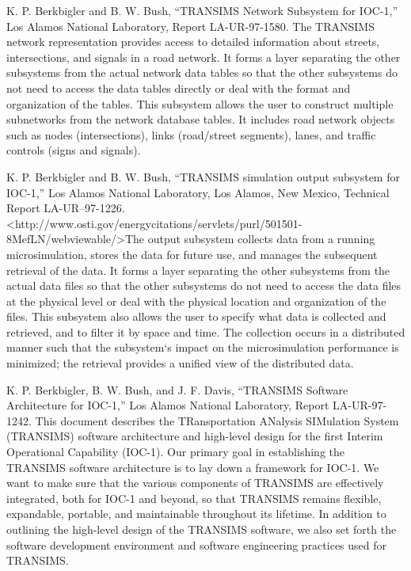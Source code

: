 \documentclass[]{article}
\begin{document}
K. P. Berkbigler and B. W. Bush, ``TRANSIMS Network Subsystem for
IOC-1,'' Los Alamos National Laboratory, Report LA-UR-97-1580. The
TRANSIMS network representation provides access to detailed information
about streets, intersections, and signals in a road network. It forms a
layer separating the other subsystems from the actual network data
tables so that the other subsystems do not need to access the data
tables directly or deal with the format and organization of the tables.
This subsystem allows the user to construct multiple subnetworks from
the network database tables. It includes road network objects such as
nodes (intersections), links (road/street segments), lanes, and traffic
controls (signs and signals).

K. P. Berkbigler and B. W. Bush, ``TRANSIMS simulation output subsystem
for IOC-1,'' Los Alamos National Laboratory, Los Alamos, New Mexico,
Technical Report LA-UR--97-1226.
\textless{}http://www.osti.gov/energycitations/servlets/purl/501501-8MefLN/webviewable/\textgreater{}The
output subsystem collects data from a running microsimulation, stores
the data for future use, and manages the subsequent retrieval of the
data. It forms a layer separating the other subsystems from the actual
data files so that the other subsystems do not need to access the data
files at the physical level or deal with the physical location and
organization of the files. This subsystem also allows the user to
specify what data is collected and retrieved, and to filter it by space
and time. The collection occurs in a distributed manner such that the
subsystem`s impact on the microsimulation performance is minimized; the
retrieval provides a unified view of the distributed data.

K. P. Berkbigler, B. W. Bush, and J. F. Davis, ``TRANSIMS Software
Architecture for IOC-1,'' Los Alamos National Laboratory, Report
LA-UR-97-1242. This document describes the TRansportation ANalysis
SIMulation System (TRANSIMS) software architecture and high-level design
for the first Interim Operational Capability (IOC-1). Our primary goal
in establishing the TRANSIMS software architecture is to lay down a
framework for IOC-1. We want to make sure that the various components of
TRANSIMS are effectively integrated, both for IOC-1 and beyond, so that
TRANSIMS remains flexible, expandable, portable, and maintainable
throughout its lifetime. In addition to outlining the high-level design
of the TRANSIMS software, we also set forth the software development
environment and software engineering practices used for TRANSIMS.
\end{document}
